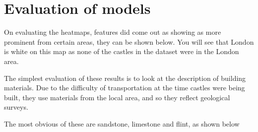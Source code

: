\documentclass[12pt]{article}
\begin{document}
\section{Evaluation of models}

On evaluating the heatmaps, features did come out as showing as more prominent from certain areas, they can be shown below. You will see that London is white on this map as none of the castles in the dataset were in the London area.

The simplest evaluation of these results is to look at the description of building materials. Due to the difficulty of transportation at the time castles were being built, they use materials from the local area, and so they reflect geological surveys.

The most obvious of these are sandstone, limestone and flint, as shown below
\end{document}
